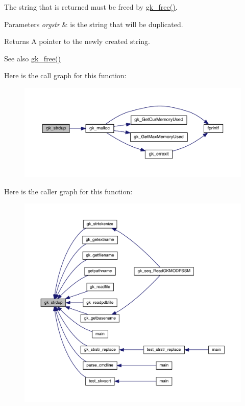 The string that is returned must be freed by \hyperlink{a00077_ac8df62c4e3d0910711a9874f9cc58884}{gk\+\_\+free()}.


\begin{DoxyParams}{Parameters}
{\em orgstr} & is the string that will be duplicated. \\
\hline
\end{DoxyParams}
\begin{DoxyReturn}{Returns}
A pointer to the newly created string. 
\end{DoxyReturn}
\begin{DoxySeeAlso}{See also}
\hyperlink{a00077_ac8df62c4e3d0910711a9874f9cc58884}{gk\+\_\+free()} 
\end{DoxySeeAlso}
Here is the call graph for this function\+:\nopagebreak
\begin{figure}[H]
\begin{center}
\leavevmode
\includegraphics[width=350pt]{a00077_af62038e97ca55f14ec2557a01bd85ca2_cgraph}
\end{center}
\end{figure}
Here is the caller graph for this function\+:\nopagebreak
\begin{figure}[H]
\begin{center}
\leavevmode
\includegraphics[width=350pt]{a00077_af62038e97ca55f14ec2557a01bd85ca2_icgraph}
\end{center}
\end{figure}
\mbox{\label{a00077_a4e5e21eb7f29fcdabd4ef027223bbdf0}} 
